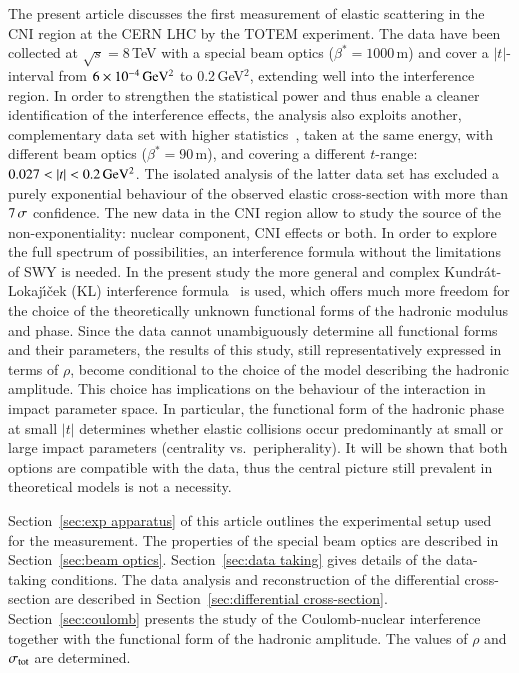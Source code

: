 The present article discusses the first measurement of elastic scattering in the CNI region at the CERN LHC by the TOTEM experiment. The data have been collected at $\sqrt{s} = 8\,$TeV with a special beam optics ($\beta^{*}=1000\,$m) and cover a $|t|$-interval from $6\times10^{-4}\,\rm GeV^{2}$ to 0.2\,GeV$^{2}$, extending well into the interference region. In order to strengthen the statistical power and thus enable a cleaner identification of the interference effects, the analysis also exploits another, complementary data set with higher statistics~\cite{8tev-90m}, taken at the same energy, with different beam optics ($\beta^{*}=90\,$m), and covering a different $t$-range: $0.027 < |t| < 0.2\,{\rm GeV^2}$. The isolated analysis of the latter data set has excluded a purely exponential behaviour of the observed elastic cross-section with more than $7\,{\rm \sigma}$ confidence. The new data in the CNI region allow to study the source of the non-exponentiality: nuclear component, CNI effects or both. In order to explore the full spectrum of possibilities, an interference formula without the limitations of SWY is needed. In the present study the more general and complex Kundr\'{a}t-Lokaj\'{\i}\v{c}ek (KL) interference formula~\cite{kl94} is used, which offers much more freedom for the choice of the theoretically unknown functional forms of the hadronic modulus and phase. Since the data cannot unambiguously determine all functional forms and their parameters, the results of this study, still representatively expressed in terms of $\rho$, become conditional to the choice of the model describing the hadronic amplitude. This choice has implications on the behaviour of the interaction in impact parameter space. In particular, the functional form of the hadronic phase at small $|t|$ determines whether elastic collisions occur predominantly at small or large impact parameters (centrality vs.~peripherality). It will be shown that both options are compatible with the data, thus the central picture still prevalent in theoretical models is not a necessity.

Section~\ref{sec:exp apparatus} of this article outlines the experimental setup used for the measurement. The properties of the special beam optics are described in Section~\ref{sec:beam optics}. Section~\ref{sec:data taking} gives details of the data-taking conditions. The data analysis and reconstruction of the differential cross-section are described in Section~\ref{sec:differential cross-section}. Section~\ref{sec:coulomb} presents the study of the Coulomb-nuclear interference together with the functional form of the hadronic amplitude. The values of $\rho$ and $\sigma_{\rm tot}$ are determined.

